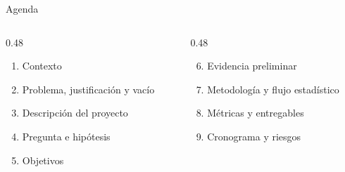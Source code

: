 \documentclass[aspectratio=169,11pt]{beamer}
\begin{document}
\begin{frame}{Agenda}
  \large
  \begin{columns}[T]
    \begin{column}{0.48\textwidth}
      \begin{enumerate}\setlength\itemsep{6pt}
        \item Contexto
        \item Problema, justificación y vacío
        \item Descripción del proyecto
        \item Pregunta e hipótesis
        \item Objetivos
      \end{enumerate}
    \end{column}
    \begin{column}{0.48\textwidth}
      \begin{enumerate}\setcounter{enumi}{5}\setlength\itemsep{6pt}
        \item Evidencia preliminar
        \item Metodología y flujo estadístico
        \item Métricas y entregables
        \item Cronograma y riesgos
      \end{enumerate}
    \end{column}
  \end{columns}
\end{frame}
\end{document}
